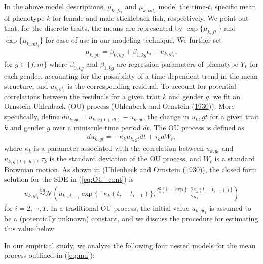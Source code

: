 \documentclass[
  12pt,
]{article}
\begin{document}
In the above model descriptions, \(\mu_{k,ft_i}\) and \(\mu_{k,mt_i}\)
model the time-\(t_i\) specific mean of phenotype \(k\) for female and
male stickleback fish, respectively. We point out that, for the discrete
traits, the means are represented by \(\exp\{\mu_{k,ft_i}\}\) and
\(\exp\{\mu_{k,mt_i}\}\) for ease of use in our modeling technique. We
further set \begin{align}
\mu_{k,gt_i} = \beta_{0,kg} + \beta_{1,kg}t_i + u_{k,gt_i},
\label{eq:mu}
\end{align} for \(g \in \{f,m\}\) where \(\beta_{0,kg}\) and
\(\beta_{1,kg}\) are regression parameters of phenotype \(Y_k\) for each
gender, accounting for the possibility of a time-dependent trend in the
mean structure, and \(u_{k,gt_i}\) is the corresponding residual. To
account for potential correlations between the residuals for a given
trait \(k\) and gender \(g\), we fit an Ornstein-Uhlenback (OU) process
(Uhlenbeck and Ornstein (\protect\hyperlink{ref-OUProcess}{1930})). More
specifically, define \(du_{k,gt} = u_{k,g(t + dt)} - u_{k,gt}\), the
change in \(u_k,gt\) for a given trait \(k\) and gender \(g\) over a
miniscule time period \(dt\). The OU process is defined as \begin{align}
du_{k,gt} = -\kappa_k u_{k,gt} dt + \tau_k dW_t,
\label{eq:OU_cont}
\end{align} where \(\kappa_k\) is a parameter associated with the
correlation between \(u_{k,gt}\) and \(u_{k,g(t+dt)}\), \(\tau_k\) is
the standard deviation of the OU process, and \(W_t\) is a standard
Brownian motion. As shown in (Uhlenbeck and Ornstein
(\protect\hyperlink{ref-OUProcess}{1930})), the closed form solution for
the SDE in (\ref{eq:OU_cont}) is \begin{align}
u_{k,gt_i} \overset{iid}{\sim}\mathcal{N}\left(u_{k,gt_{i-1}}\exp\{-\kappa_k(t_{i} - t_{i-1})\} , \frac{\tau_k^2(1 - \exp\{-2\kappa_k(t_{i} - t_{i-1}))\}}{2\kappa_k}\right)
\label{eq:OU_sol}
\end{align} for \(i = 2,\cdots,T\). In a traditional OU process, the
initial value \(u_{k,gt_1}\) is assumed to be a (potentially unknown)
constant, and we discuss the procedure for estimating this value below.

In our empirical study, we analyze the following four nested models for
the mean process outlined in (\ref{eq:mu}):
\end{document}

